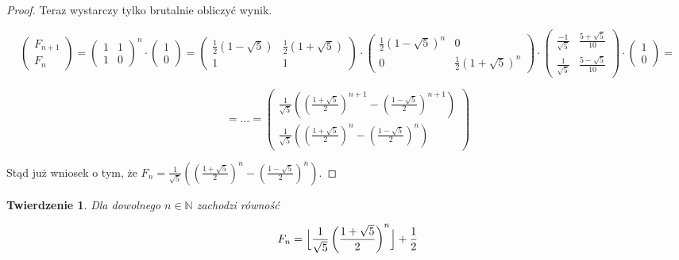 \documentclass{article}
\newtheorem{thm}{Twierdzenie}
\begin{document}
\begin{proof}
Teraz wystarczy tylko brutalnie obliczyć wynik.

$$\begin{pmatrix} F_{n+1} \\ F_n \end{pmatrix} = \begin{pmatrix} 1 & 1 \\ 1 & 0 \end{pmatrix}^n \cdot \begin{pmatrix} 1 \\ 0 \end{pmatrix} = \begin{pmatrix} \frac{1}{2} \left( 1 - \sqrt{5} \right) & \frac{1}{2} \left( 1 + \sqrt{5} \right) \\ 1 & 1 \end{pmatrix} \cdot \begin{pmatrix} \frac{1}{2} \left( 1 - \sqrt{5} \right)^n & 0 \\ 0 & \frac{1}{2} \left( 1 + \sqrt{5} \right)^n \end{pmatrix} \cdot \begin{pmatrix} \frac{-1}{\sqrt{5}} & \frac{5+\sqrt{5}}{10} \\ \frac{1}{\sqrt{5}} & \frac{5-\sqrt{5}}{10} \end{pmatrix} \cdot \begin{pmatrix} 1 \\ 0 \end{pmatrix} =  $$


$$
= \ldots = \begin{pmatrix} \frac{1}{\sqrt{5}} \left( \left( \frac{1 + \sqrt{5}}{2} \right)^{n+1} - \left( \frac{1 - \sqrt{5}}{2} \right)^{n+1}  \right)\\ \frac{1}{\sqrt{5}} \left( \left( \frac{1 + \sqrt{5}}{2} \right)^n - \left( \frac{1 - \sqrt{5}}{2} \right)^n  \right) \end{pmatrix}
$$

Stąd już wniosek o tym, że $F_n = \frac{1}{\sqrt{5}} \left( \left( \frac{1 + \sqrt{5}}{2} \right)^n - \left( \frac{1 - \sqrt{5}}{2} \right)^n  \right)$.

\end{proof}

\begin{thm}
Dla dowolnego $n \in \mathbb{N}$ zachodzi równość

$$F_n = \Bigl\lfloor \frac{1}{\sqrt{5}} \left( \frac{1+\sqrt{5}}{2} \right)^n \Bigr\rfloor + \frac{1}{2}$$

\end{thm}
\end{document}
